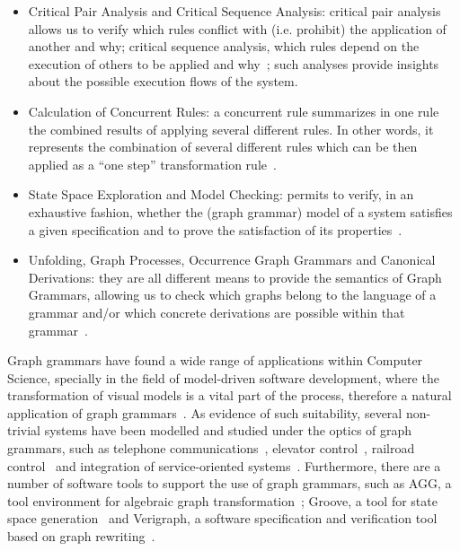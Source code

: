 \begin{itemize}
  \item Critical Pair Analysis and Critical Sequence Analysis: critical pair analysis allows us to verify which rules conflict with (i.e. prohibit) the application of another and why; critical sequence analysis, which rules depend on the execution of others to be applied and why~\cite{Lambers2008a}; such analyses provide insights about the possible execution flows of the system.
  \item Calculation of Concurrent Rules: a concurrent rule summarizes in one rule the combined results of applying several different rules. In other words, it represents the combination of several different rules which can be then applied as a ``one step'' transformation rule~\cite{Lambers2008,BezerraETMF2016}.
  \item State Space Exploration and Model Checking: permits to verify, in an exhaustive fashion, whether the (graph grammar) model of a system satisfies a given specification and to prove the satisfaction of its properties~\cite{Rensink2004}.
  \item Unfolding, Graph Processes, Occurrence Graph Grammars and Canonical Derivations: they are all different means to provide the semantics of Graph Grammars, allowing us to check which graphs belong to the language of a grammar and/or which concrete derivations are possible within that grammar~\cite{Corradini1996,Ribeiro1996}.
\end{itemize}

Graph grammars have found a wide range of applications within Computer Science, specially in the field of model-driven software development, where the transformation of visual models is a vital part of the process, therefore a natural application of graph grammars~\cite{Rozenberg1997}.
As evidence of such suitability, several non-trivial systems have been modelled and studied under the optics of graph grammars, such as telephone communications~\cite{Ribeiro1996}, elevator control~\cite{Lambers2010}, railroad control~\cite{Pennemann2009} and integration of service-oriented systems~\cite{Giese2015}.
Furthermore, there are a number of software tools to support the use of graph grammars, such as AGG, a tool environment for algebraic graph transformation~\cite{Taentzer2000}; Groove, a tool for state space generation~\cite{Rensink2004} and Verigraph, a software specification and verification tool based on graph rewriting~\cite{verigraph}.

